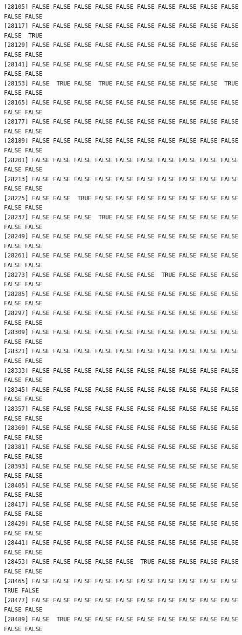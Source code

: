 \documentclass[
  a4paper,
  DIV=11,
  numbers=noendperiod]{scrartcl}
\begin{document}
\begin{verbatim}
[28105] FALSE FALSE FALSE FALSE FALSE FALSE FALSE FALSE FALSE FALSE FALSE FALSE
[28117] FALSE FALSE FALSE FALSE FALSE FALSE FALSE FALSE FALSE FALSE FALSE  TRUE
[28129] FALSE FALSE FALSE FALSE FALSE FALSE FALSE FALSE FALSE FALSE FALSE FALSE
[28141] FALSE FALSE FALSE FALSE FALSE FALSE FALSE FALSE FALSE FALSE FALSE FALSE
[28153] FALSE  TRUE FALSE  TRUE FALSE FALSE FALSE FALSE FALSE  TRUE FALSE FALSE
[28165] FALSE FALSE FALSE FALSE FALSE FALSE FALSE FALSE FALSE FALSE FALSE FALSE
[28177] FALSE FALSE FALSE FALSE FALSE FALSE FALSE FALSE FALSE FALSE FALSE FALSE
[28189] FALSE FALSE FALSE FALSE FALSE FALSE FALSE FALSE FALSE FALSE FALSE FALSE
[28201] FALSE FALSE FALSE FALSE FALSE FALSE FALSE FALSE FALSE FALSE FALSE FALSE
[28213] FALSE FALSE FALSE FALSE FALSE FALSE FALSE FALSE FALSE FALSE FALSE FALSE
[28225] FALSE FALSE  TRUE FALSE FALSE FALSE FALSE FALSE FALSE FALSE FALSE FALSE
[28237] FALSE FALSE FALSE  TRUE FALSE FALSE FALSE FALSE FALSE FALSE FALSE FALSE
[28249] FALSE FALSE FALSE FALSE FALSE FALSE FALSE FALSE FALSE FALSE FALSE FALSE
[28261] FALSE FALSE FALSE FALSE FALSE FALSE FALSE FALSE FALSE FALSE FALSE FALSE
[28273] FALSE FALSE FALSE FALSE FALSE FALSE  TRUE FALSE FALSE FALSE FALSE FALSE
[28285] FALSE FALSE FALSE FALSE FALSE FALSE FALSE FALSE FALSE FALSE FALSE FALSE
[28297] FALSE FALSE FALSE FALSE FALSE FALSE FALSE FALSE FALSE FALSE FALSE FALSE
[28309] FALSE FALSE FALSE FALSE FALSE FALSE FALSE FALSE FALSE FALSE FALSE FALSE
[28321] FALSE FALSE FALSE FALSE FALSE FALSE FALSE FALSE FALSE FALSE FALSE FALSE
[28333] FALSE FALSE FALSE FALSE FALSE FALSE FALSE FALSE FALSE FALSE FALSE FALSE
[28345] FALSE FALSE FALSE FALSE FALSE FALSE FALSE FALSE FALSE FALSE FALSE FALSE
[28357] FALSE FALSE FALSE FALSE FALSE FALSE FALSE FALSE FALSE FALSE FALSE FALSE
[28369] FALSE FALSE FALSE FALSE FALSE FALSE FALSE FALSE FALSE FALSE FALSE FALSE
[28381] FALSE FALSE FALSE FALSE FALSE FALSE FALSE FALSE FALSE FALSE FALSE FALSE
[28393] FALSE FALSE FALSE FALSE FALSE FALSE FALSE FALSE FALSE FALSE FALSE FALSE
[28405] FALSE FALSE FALSE FALSE FALSE FALSE FALSE FALSE FALSE FALSE FALSE FALSE
[28417] FALSE FALSE FALSE FALSE FALSE FALSE FALSE FALSE FALSE FALSE FALSE FALSE
[28429] FALSE FALSE FALSE FALSE FALSE FALSE FALSE FALSE FALSE FALSE FALSE FALSE
[28441] FALSE FALSE FALSE FALSE FALSE FALSE FALSE FALSE FALSE FALSE FALSE FALSE
[28453] FALSE FALSE FALSE FALSE FALSE  TRUE FALSE FALSE FALSE FALSE FALSE FALSE
[28465] FALSE FALSE FALSE FALSE FALSE FALSE FALSE FALSE FALSE FALSE  TRUE FALSE
[28477] FALSE FALSE FALSE FALSE FALSE FALSE FALSE FALSE FALSE FALSE FALSE FALSE
[28489] FALSE  TRUE FALSE FALSE FALSE FALSE FALSE FALSE FALSE FALSE FALSE FALSE

\end{verbatim}
\end{document}
